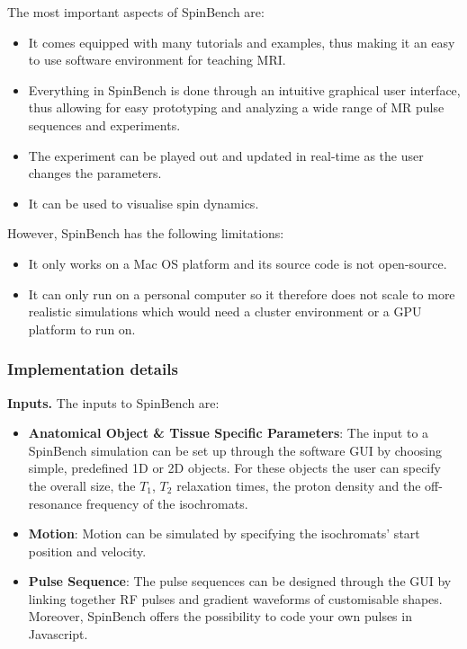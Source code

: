 The most important aspects of SpinBench are:
\begin{itemize}

    \item It comes equipped with many tutorials and examples, thus making it an easy to use software environment for teaching MRI.
    
    \item Everything in SpinBench is done through an intuitive graphical user interface, thus allowing for easy prototyping and analyzing a wide range of MR pulse sequences and experiments.
    
    \item The experiment can be played out and updated in real-time as the user changes the parameters.
    
    \item It can be used to visualise spin dynamics.
    
\end{itemize}

\hfill

However, SpinBench has the following limitations:
\begin{itemize}
    
    \item It only works on a Mac OS platform and its source code is not open-source.
    
    \item It can only run on a personal computer so it therefore does not scale to more realistic simulations which would need a cluster environment or a GPU platform to run on.
    
\end{itemize}

\hfill

\subsubsection{Implementation details}

\textbf{Inputs.} The inputs to SpinBench are:

\begin{itemize}
    
    \item \textbf{Anatomical Object \& Tissue Specific Parameters}: The input to a SpinBench simulation can be set up through the software GUI by choosing simple, predefined 1D or 2D objects. 
    For these objects the user can specify the overall size, the $T_1$, $T_2$ relaxation times, the proton density and the off-resonance frequency of the isochromats.
    
    \item \textbf{Motion}: Motion can be simulated by specifying the isochromats' start position and velocity.
    
    \item \textbf{Pulse Sequence}: The pulse sequences can be designed through the GUI by linking together RF pulses and gradient waveforms of customisable shapes.
    Moreover, SpinBench offers the possibility to code your own pulses in Javascript.
    
\end{itemize}

